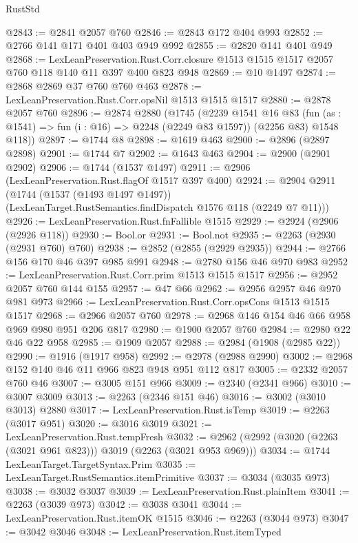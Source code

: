 \begin{lexlean}{RustStd}
\begin{coremodule}
@2843 := @2841 @2057 @760
@2846 := @2843 @172 @404 @993
@2852 := @2766 @141 @171 @401 @403 @949 @992
@2855 := @2820 @141 @401 @949
@2868 := LexLeanPreservation.Rust.Corr.closure
    @1513
    @1515
    @1517
    @2057
    @760
    @118
    @140
    @11
    @397
    @400
    @823
    @948
@2869 := @10 @1497
@2874 := @2868 @2869 @37 @760 @760 @463
@2878 := LexLeanPreservation.Rust.Corr.opsNil @1513 @1515 @1517
@2880 := @2878 @2057 @760
@2896 := @2874
    @2880
    (@1745
      (@2239
        @1541
        @16
        @83
        (fun (as : @1541) => fun (i : @16) => @2248 (@2249 @83 @1597))
        (@2256 @83)
        @1548
        @118))
@2897 := @1744 @8
@2898 := @1619 @463
@2900 := @2896 (@2897 @2898)
@2901 := @1744 @7
@2902 := @1643 @463
@2904 := @2900 (@2901 @2902)
@2906 := @1744 (@1537 @1497)
@2911 := @2906 (LexLeanPreservation.Rust.flagOf @1517 @397 @400)
@2924 := @2904
    @2911
    (@1744
      (@1537 (@1493 @1497 @1497))
      (LexLeanTarget.RustSemantics.findDispatch @1576 @118 (@2249 @7 @11)))
@2926 := LexLeanPreservation.Rust.fnFallible @1515
@2929 := @2924 (@2906 (@2926 @118))
@2930 := Bool.or
@2931 := Bool.not
@2935 := @2263 (@2930 (@2931 @760) @760)
@2938 := @2852 (@2855 (@2929 @2935))
@2944 := @2766 @156 @170 @46 @397 @985 @991
@2948 := @2780 @156 @46 @970 @983
@2952 := LexLeanPreservation.Rust.Corr.prim @1513 @1515 @1517
@2956 := @2952 @2057 @760 @144 @155
@2957 := @47 @66
@2962 := @2956 @2957 @46 @970 @981 @973
@2966 := LexLeanPreservation.Rust.Corr.opsCons @1513 @1515 @1517
@2968 := @2966 @2057 @760
@2978 := @2968 @146 @154 @46 @66 @958 @969 @980 @951 @206 @817
@2980 := @1900 @2057 @760
@2984 := @2980 @22 @46 @22 @958
@2985 := @1909 @2057
@2988 := @2984 (@1908 (@2985 @22))
@2990 := @1916 (@1917 @958)
@2992 := @2978 (@2988 @2990)
@3002 := @2968 @152 @140 @46 @11 @966 @823 @948 @951 @112 @817
@3005 := @2332 @2057 @760 @46
@3007 := @3005 @151 @966
@3009 := @2340 (@2341 @966)
@3010 := @3007 @3009
@3013 := @2263 (@2346 @151 @46)
@3016 := @3002 (@3010 @3013) @2880
@3017 := LexLeanPreservation.Rust.isTemp
@3019 := @2263 (@3017 @951)
@3020 := @3016 @3019
@3021 := LexLeanPreservation.Rust.tempFresh
@3032 := @2962 (@2992 (@3020 (@2263 (@3021 @961 @823))) @3019 (@2263 (@3021 @953 @969)))
@3034 := @1744 LexLeanTarget.TargetSyntax.Prim
@3035 := LexLeanTarget.RustSemantics.itemPrimitive
@3037 := @3034 (@3035 @973)
@3038 := @3032 @3037
@3039 := LexLeanPreservation.Rust.plainItem
@3041 := @2263 (@3039 @973)
@3042 := @3038 @3041
@3044 := LexLeanPreservation.Rust.itemOK @1515
@3046 := @2263 (@3044 @973)
@3047 := @3042 @3046
@3048 := LexLeanPreservation.Rust.itemTyped

\end{coremodule}
\end{lexlean}
